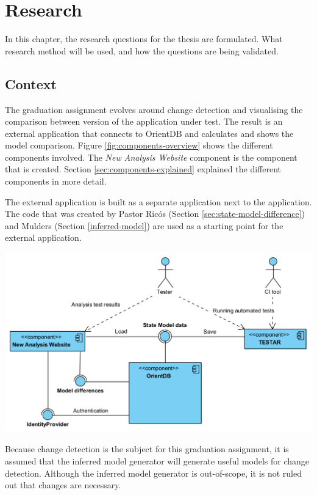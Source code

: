 \chapter{Research} \label{questions}
In this chapter, the research questions for the thesis are formulated. What research method will be used, and how the questions are being validated.

\section{Context}
The graduation assignment evolves around change detection and visualising the comparison between version of the application under test. The result is an external application that connects to OrientDB and calculates and shows the model comparison. Figure \ref{fig:components-overview} shows the different components involved. The \textit{New Analysis Website} component is the component that is created. Section \ref{sec:components-explained} explained the different components in more detail.

The external application is built as a separate application next to the \testar application. The code that was created by Pastor Ricós (Section \ref{sec:state-model-difference}) and Mulders (Section \ref{inferred-model}) are used as a starting point for the external application. 

\begingroup
\captionsetup{type=figure}
\includegraphics[scale=0.4]{images/3-UML-high-level.png}
\label{fig:components-overview}
\endgroup

Because change detection is the subject for this graduation assignment, it is assumed that the inferred model generator will generate useful models for change detection. Although the inferred model generator is out-of-scope, it is not ruled out that changes are necessary.

